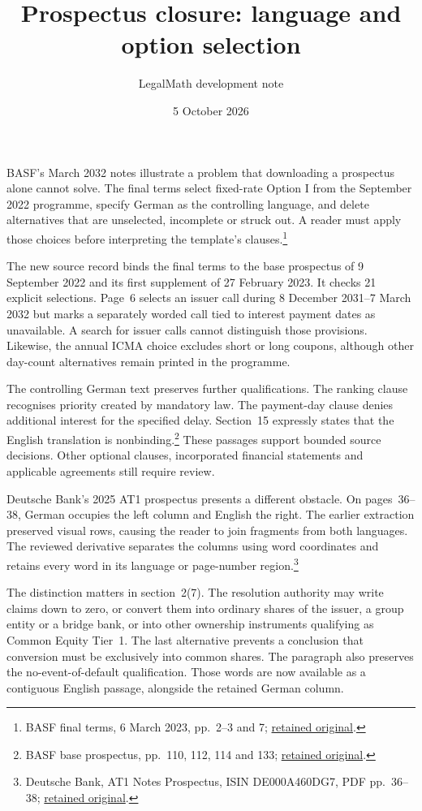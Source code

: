 \documentclass[11pt]{article}
\title{Prospectus closure: language and option selection}
\author{LegalMath development note}
\date{5 October 2026}
\begin{document}
\maketitle
BASF's March 2032 notes illustrate a problem that downloading a prospectus alone
cannot solve. The final terms select fixed-rate Option I from the September 2022
programme, specify German as the controlling language, and delete alternatives
that are unselected, incomplete or struck out. A reader must apply those choices
before interpreting the template's clauses.\footnote{BASF final terms,
6 March 2023, pp.~2--3 and 7; \href{../../../../prospectus/evidence-master/requests/044-basf-final/response.body}{retained original}.}

The new source record binds the final terms to the base prospectus of
9 September 2022 and its first supplement of 27 February 2023. It checks
21 explicit selections. Page~6 selects an issuer call during
8 December 2031--7 March 2032 but marks a separately worded call tied to interest
payment dates as unavailable. A search for issuer calls cannot distinguish those
provisions. Likewise, the annual ICMA choice excludes short or long coupons,
although other day-count alternatives remain printed in the programme.

The controlling German text preserves further qualifications. The ranking clause
recognises priority created by mandatory law. The payment-day clause denies
additional interest for the specified delay. Section~15 expressly states that
the English translation is nonbinding.\footnote{BASF base prospectus,
pp.~110, 112, 114 and 133; \href{../../../../prospectus/evidence-closure/requests/037-basf-base-september-2022-exchange/response.bin}{retained original}.}
These passages support bounded source decisions. Other optional clauses,
incorporated financial statements and applicable agreements still require review.

\medskip
Deutsche Bank's 2025 AT1 prospectus presents a different obstacle. On pages~36--38,
German occupies the left column and English the right. The earlier extraction
preserved visual rows, causing the reader to join fragments from both languages.
The reviewed derivative separates the columns using word coordinates and retains
every word in its language or page-number region.\footnote{Deutsche Bank,
AT1 Notes Prospectus, ISIN DE000A460DG7, PDF pp.~36--38;
\href{../../../../prospectus/classification-additions/originals/deutsche-at1-2025.pdf}{retained original}.}

The distinction matters in section~2(7). The resolution authority may write
claims down to zero, or convert them into ordinary shares of the issuer, a group
entity or a bridge bank, or into other ownership instruments qualifying as
Common Equity Tier~1. The last alternative prevents a conclusion that conversion
must be exclusively into common shares. The paragraph also preserves the
no-event-of-default qualification. Those words are now available as a contiguous
English passage, alongside the retained German column.
\end{document}
